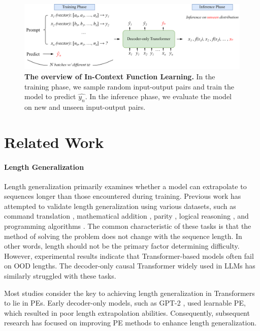 \documentclass[letterpaper]{article} %
\begin{document}
\begin{figure}
    \center
    \includegraphics[width=1.8\columnwidth]{AnonymousSubmission/LaTeX/imgs/related-work/icl.png}
    \caption{
        \small\textbf{The overview of In-Context Function Learning.} In the training phase, we sample random input-output pairs and train the model to predict $\hat{y_n}$. In the inference phase, we evaluate the model on new and unseen input-output pairs.
    }
    \label{fig:icl_setup}
\end{figure}

\section{Related Work}

\paragraph{Length Generalization}
Length generalization primarily examines whether a model can extrapolate to sequences longer than those encountered during training. Previous work has attempted to validate length generalization using various datasets, such as command translation \cite{lake-2018-scan}, mathematical addition \cite{lee-2024-teaching, zhou-2024-transformers, zhou-2024-what}, parity \cite{anil-2022-exploring, zhou-2024-what}, logical reasoning \cite{zhang-2023-unveiling}, and programming algorithms \cite{deletang-2023-neural, zhou-2024-what}. The common characteristic of these tasks is that the method of solving the problem does not change with the sequence length. In other words, length should not be the primary factor determining difficulty. However, experimental results indicate that Transformer-based models often fail on OOD lengths. The decoder-only causal Transformer widely used in LLMs has similarly struggled with these tasks.

Most studies \cite{kazemnejad-2023-impact, zhou-2024-transformers, mcleish-2024-transformers, wang-2024-length} consider the key to achieving length generalization in Transformers to lie in PEs. Early decoder-only models, such as GPT-2 \cite{radford-2019-language}, used learnable PE, which resulted in poor length extrapolation abilities. Consequently, subsequent research has focused on improving PE methods to enhance length generalization.
\end{document}
